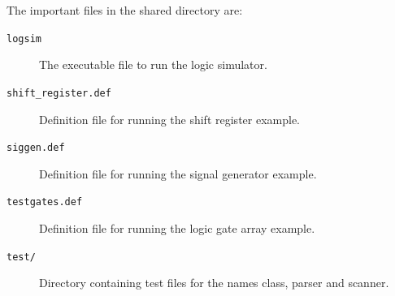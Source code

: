 \documentclass[a4paper,10pt]{article}  %
\begin{document}
The important files in the shared directory are:
\begin{description}
\item[\texttt{logsim}] The executable file to run the logic simulator.
\item[\texttt{shift\_register.def}] Definition file for running the
  shift register example.
\item[\texttt{siggen.def}] Definition file for running the
  signal generator example.
\item[\texttt{testgates.def}] Definition file for running the
  logic gate array example.
\item[\texttt{test/}] Directory containing test files for the names
  class, parser and scanner.
\end{description}
\end{document}
